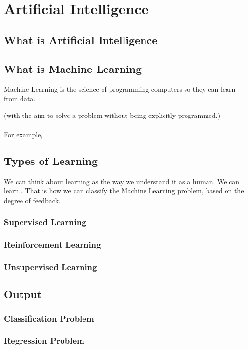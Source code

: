 \documentclass[../main.tex]{subfiles}
\begin{document}
	\chapter{Artificial Intelligence} \label{ch:machine}
	
	\section{What is Artificial Intelligence}
	\section{What is Machine Learning}
	\noindent Machine Learning is the science of programming computers so they can learn from data. 
	
	(with the aim to solve a problem without being explicitly programmed.) \\ \\ 
	
	For example, 
	
	

	\section{Types of Learning}
	We can think about learning as the way we understand it as a human. We can learn . That is how we can classify the Machine Learning problem, based on the degree of feedback.



	\subsection{Supervised Learning}
	\subsection{Reinforcement Learning}
	\subsection{Unsupervised Learning}
	
	\section{Output}
	\subsection{Classification Problem}
	\subsection{Regression Problem}
	
	
\end{document}
